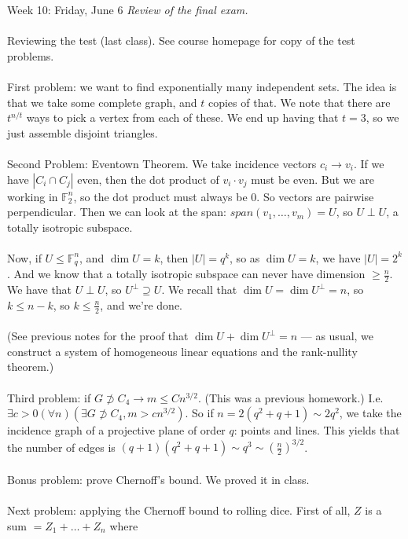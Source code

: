 \documentclass[12pt]{article}
\theoremstyle{remark}
\newcommand{\F}{\mathbb{F}}
\begin{document}
\label{28}\begin{section}
{Week 10: Friday, June 6}
\indent\textit{Review of the final exam.}
\\\\
Reviewing the test (last class). See course homepage for copy of the test problems.
\\\\
First problem: we want to find exponentially many independent sets. The idea is that we take some complete graph, and $t$ copies of that. We note that there are $t^{n/t}$ ways to pick a vertex from each of these. We end up having that $t=3$, so we just assemble disjoint triangles.
\\\\
Second Problem: Eventown Theorem. We take incidence vectors $c_i \to v_i$. If we have $|C_i \cap C_j|$ even, then the dot product of $v_i \cdot v_j$ must be even. But we are working in $\F_2^n$, so the dot product must always be $0$.  So vectors are pairwise perpendicular. Then we can look at the span: $span(v_1,\ldots,v_m)=U$, so $U \perp U$, a totally isotropic subspace.
\\\\
Now, if $U \leq \F_q^n$, and $\dim U = k$, then $|U| = q^k$, so as $\dim U = k$, we have $|U| = 2^k$. And we know that a totally isotropic subspace can never have dimension $\geq \frac n 2$. We have that $U \perp U$, so $U^\perp \supseteq U$. We recall that $\dim U = \dim U^\perp = n$, so $k \leq n-k$, so $k \leq \frac n 2$, and we're done.
\\\\
(See previous notes for the proof that $\dim U + \dim U^\perp = n$ --- as usual, we construct a system of homogeneous linear equations and the rank-nullity theorem.)
\\\\
Third problem: if $G \not \supset C_4 \to m \leq Cn^{3/2}$.  (This was a previous homework.) I.e. $\exists c > 0 (\forall n)(\exists G \not \supset C_4, m > cn^{3/2})$. So if $n = 2(q^2+q+1) \sim 2q^2$, we take the incidence graph of a projective plane of order $q$: points and lines. This yields that the number of edges is $(q+1)(q^2+q+1) \sim q^3 \sim \left( \frac n 2 \right)^{3/2}$.
\\\\
Bonus problem: prove Chernoff's bound. We proved it in class.
\\\\
Next problem: applying the Chernoff bound to rolling dice. First of all, $Z$ is a sum $= Z_1 + \ldots + Z_n$ where

\end{section}
\end{document}
